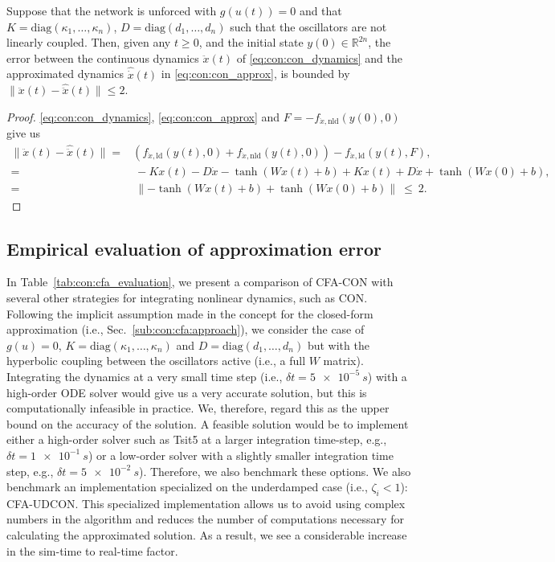 \begin{lemma}\label{lemma:con:con_cfa_bounds_lemma}
    Suppose that the network is unforced with $g(u(t)) = 0$ and that $K = \mathrm{diag}(\kappa_1, \dots, \kappa_n)$, $D = \mathrm{diag}(d_1, \dots, d_n)$ such that the oscillators are not linearly coupled. Then, given any $t \geq 0$, and the initial state $y(0) \in \mathbb{R}^{2n}$, the error between the continuous dynamics $\ddot{x}(t)$ of \eqref{eq:con:con_dynamics} and the approximated dynamics $\hat{\dot{x}}(t)$ in \eqref{eq:con:con_approx}, is bounded by $\lVert \ddot{x}(t) - \hat{\ddot{x}}(t) \rVert \leq 2$. 
\end{lemma}
\begin{proof}
    \eqref{eq:con:con_dynamics}, \eqref{eq:con:con_approx} and $F =  -f_{\ddot{x}, \mathrm{nld}}(y(0), 0)$ give us
    \begin{equation}
    \begin{split}
        \lVert \ddot{x}(t) - \hat{\ddot{x}}(t) \rVert =& \left (f_{\ddot{x},\mathrm{ld}}(y(t), 0) + f_{\ddot{x},\mathrm{nld}}(y(t), 0) \right ) - f_{\ddot{x},\mathrm{ld}}(y(t), F),\\
        =& \: -K x(t) -D \dot{x} -\tanh(W x(t) + b) + K x(t) + D \dot{x} + \tanh(W x(0) + b),\\
        =& \: \lVert -\tanh(W x(t) + b) + \tanh(W x(0) + b) \rVert
        \: \leq \: 2.
    \end{split}
    \end{equation}
    
\end{proof}

\subsection{Empirical evaluation of approximation error}
In Table~\ref{tab:con:cfa_evaluation}, we present a comparison of \gls{CFA-CON} with several other strategies for integrating nonlinear dynamics, such as \gls{CON}.
Following the implicit assumption made in the concept for the closed-form approximation (i.e., Sec.~\ref{sub:con:cfa:approach}), we consider the case of $g(u) = 0$, $K = \mathrm{diag}(\kappa_1, \dots, \kappa_n)$ and $D = \mathrm{diag}(d_1, \dots, d_n)$ but with the hyperbolic coupling between the oscillators active (i.e., a full $W$ matrix).
Integrating the dynamics at a very small time step (i.e., $\delta t = \num{5e-5}~\si{s}$) with a high-order \gls{ODE} solver would give us a very accurate solution, but this is computationally infeasible in practice. We, therefore, regard this as the upper bound on the accuracy of the solution.
A feasible solution would be to implement either a high-order solver such as Tsit5 at a larger integration time-step, e.g., $\delta t = \num{1e-1}~\si{s}$) or a low-order solver with a slightly smaller integration time step, e.g., $\delta t = \num{5e-2}~\si{s}$). Therefore, we also benchmark these options.
We also benchmark an implementation specialized on the underdamped case (i.e., $\zeta_i <1$): \gls{CFA-UDCON}. This specialized implementation allows us to avoid using complex numbers in the algorithm and reduces the number of computations necessary for calculating the approximated solution.
As a result, we see a considerable increase in the sim-time to real-time factor.

